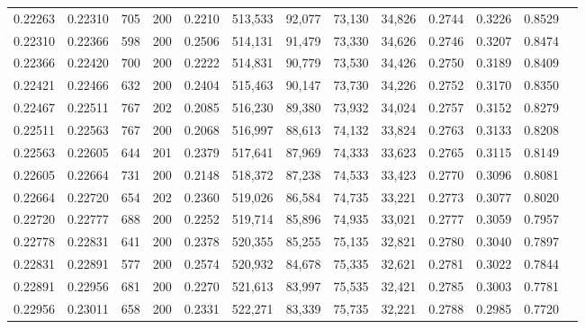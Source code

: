 \begin{tabular}{rrrrrrrrrrrrr}
0.22263 & 0.22310 &   705 & 200 &                                     0.2210 & 513,533 &  92,077 &  73,130 &  34,826 & 0.2744 & 0.3226 & 0.8529 \\
0.22310 & 0.22366 &   598 & 200 &                                     0.2506 & 514,131 &  91,479 &  73,330 &  34,626 & 0.2746 & 0.3207 & 0.8474 \\
0.22366 & 0.22420 &   700 & 200 &                                     0.2222 & 514,831 &  90,779 &  73,530 &  34,426 & 0.2750 & 0.3189 & 0.8409 \\
0.22421 & 0.22466 &   632 & 200 &                                     0.2404 & 515,463 &  90,147 &  73,730 &  34,226 & 0.2752 & 0.3170 & 0.8350 \\
0.22467 & 0.22511 &   767 & 202 &                                     0.2085 & 516,230 &  89,380 &  73,932 &  34,024 & 0.2757 & 0.3152 & 0.8279 \\
0.22511 & 0.22563 &   767 & 200 &                                     0.2068 & 516,997 &  88,613 &  74,132 &  33,824 & 0.2763 & 0.3133 & 0.8208 \\
0.22563 & 0.22605 &   644 & 201 &                                     0.2379 & 517,641 &  87,969 &  74,333 &  33,623 & 0.2765 & 0.3115 & 0.8149 \\
0.22605 & 0.22664 &   731 & 200 &                                     0.2148 & 518,372 &  87,238 &  74,533 &  33,423 & 0.2770 & 0.3096 & 0.8081 \\
0.22664 & 0.22720 &   654 & 202 &                                     0.2360 & 519,026 &  86,584 &  74,735 &  33,221 & 0.2773 & 0.3077 & 0.8020 \\
0.22720 & 0.22777 &   688 & 200 &                                     0.2252 & 519,714 &  85,896 &  74,935 &  33,021 & 0.2777 & 0.3059 & 0.7957 \\
0.22778 & 0.22831 &   641 & 200 &                                     0.2378 & 520,355 &  85,255 &  75,135 &  32,821 & 0.2780 & 0.3040 & 0.7897 \\
0.22831 & 0.22891 &   577 & 200 &                                     0.2574 & 520,932 &  84,678 &  75,335 &  32,621 & 0.2781 & 0.3022 & 0.7844 \\
0.22891 & 0.22956 &   681 & 200 &                                     0.2270 & 521,613 &  83,997 &  75,535 &  32,421 & 0.2785 & 0.3003 & 0.7781 \\
0.22956 & 0.23011 &   658 & 200 &                                     0.2331 & 522,271 &  83,339 &  75,735 &  32,221 & 0.2788 & 0.2985 & 0.7720 \\

\end{tabular}
